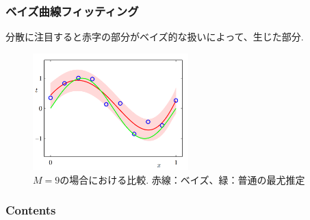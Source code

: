 \documentclass[uplatex,dvipdfmx,11pt,notheorems]{beamer}
\theoremstyle{definition}
\begin{document}
\begin{frame}\frametitle{ベイズ曲線フィッティング}
分散に注目すると赤字の部分がベイズ的な扱いによって、生じた部分.

\begin{figure}[tb]
	\centering
	\includegraphics[width=6cm,clip]{gauss4.png}
	\caption{$M=9$の場合における比較. 赤線：ベイズ、緑：普通の最尤推定}
	\label{fig1}
	\end{figure}



\end{frame}



 \begin{frame}\frametitle{Contents}
 \tableofcontents %
 \end{frame}
\end{document}
